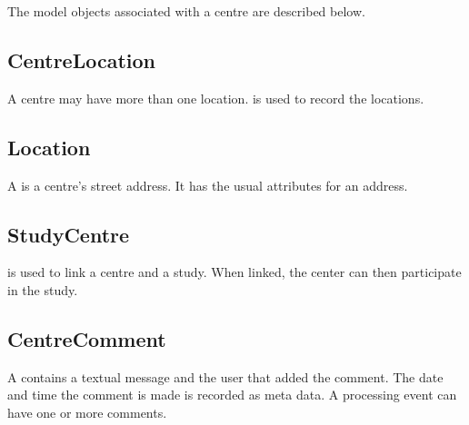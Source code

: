 The model objects associated with a centre are described below.

\subsection*{CentreLocation}
A centre may have more than one location.  is used
to record the locations.

\subsection*{Location}
A  is a centre's street address. It has the usual
attributes for an address.

\subsection*{StudyCentre}
 is used to link a centre and a study. When linked, the
center can then participate in the study.

\subsection*{CentreComment}
A  contains a textual message and the
user that added the comment. The date and time the comment is made is recorded
as meta data. A processing event can have one or more comments.

